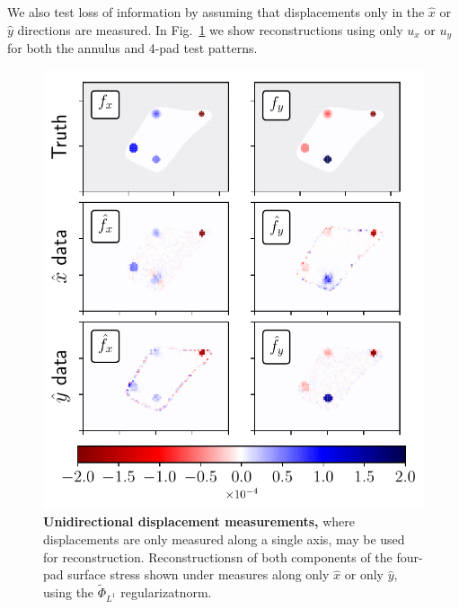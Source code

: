 \documentclass[aps,prl,reprint,twocolumn,groupedaddress,showpacs]{revtex4}
\begin{document}
We also test loss of information by assuming that 
displacements only in the $\hat{x}$ or $\hat{y}$ directions 
are measured. In Fig.~\ref{XYONLY} we show reconstructions using only 
$u_{x}$ or $u_{y}$ for both the annulus and 4-pad test patterns.

\begin{figure}
\includegraphics[width=\linewidth]{unidirectionfig}
\caption{\textbf{Unidirectional displacement measurements,} where displacements
are only measured along a single axis, may be used for reconstruction. Reconstructionsn 
of both components of the four-pad surface stress shown under measures along only $\hat{x}$
or only $\hat{y},$ using the $\tilde{\Phi}_{L^1}$ regularizatnorm.}
\label{XYONLY}
\end{figure}


\end{document}
